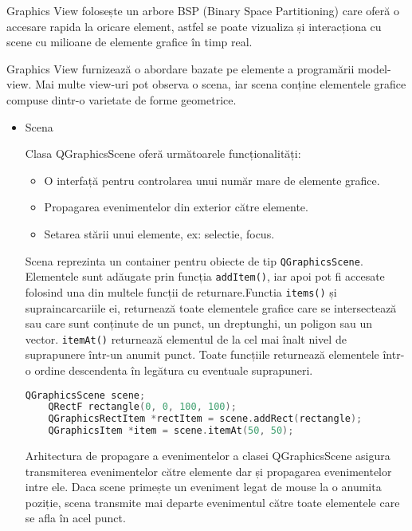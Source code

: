 Graphics View folosește un arbore BSP (Binary Space Partitioning) care oferă o accesare rapida la oricare element, astfel se poate 
vizualiza și interacționa cu scene cu milioane de elemente grafice în timp real.\newline

Graphics View furnizează o abordare bazate pe elemente a programării model-view. Mai multe view-uri pot observa o scena, 
iar scena conține elementele grafice compuse dintr-o varietate de forme geometrice.\newline

\begin{itemize}
    \item Scena
    
    Clasa QGraphicsScene oferă următoarele funcționalități:
    \begin{itemize}
        \item O interfață pentru controlarea unui număr mare de elemente grafice.
        \item Propagarea evenimentelor din exterior către elemente.
        \item Setarea stării unui elemente, ex: selectie, focus.
    \end{itemize}

    Scena reprezinta un container pentru obiecte de tip \verb|QGraphicsScene|. Elementele sunt adăugate prin funcția 
    \verb|addItem()|, iar apoi pot fi accesate folosind una din multele funcții de returnare.Functia 
    \verb|items()| și supraincarcariile ei, returnează toate elementele grafice care se intersectează sau 
    care sunt conținute de un punct, un dreptunghi, un poligon sau un vector. \verb|itemAt()| returnează elementul 
    de la cel mai înalt nivel de suprapunere într-un anumit punct. Toate funcțiile returnează elementele într-o ordine 
    descendenta în legătura cu eventuale suprapuneri.\newline

    \begin{lstlisting}[language=C++]
    QGraphicsScene scene;
    QRectF rectangle(0, 0, 100, 100);
    QGraphicsRectItem *rectItem = scene.addRect(rectangle);
    QGraphicsItem *item = scene.itemAt(50, 50);
    \end{lstlisting}

    Arhitectura de propagare a evenimentelor a clasei QGraphicsScene asigura transmiterea evenimentelor către 
    elemente dar și propagarea evenimentelor intre ele. Daca scene primește un eveniment legat de mouse la o anumita poziție, 
    scena transmite mai departe evenimentul către toate elementele care se afla în acel punct.\newline


\end{itemize}
